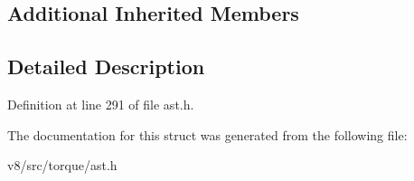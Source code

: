 \subsection*{Additional Inherited Members}


\subsection{Detailed Description}


Definition at line 291 of file ast.\+h.



The documentation for this struct was generated from the following file\+:\begin{DoxyCompactItemize}
\item 
v8/src/torque/ast.\+h\end{DoxyCompactItemize}
